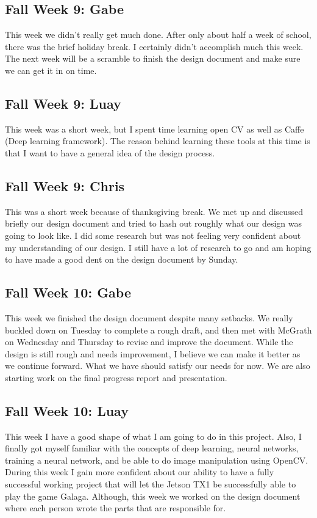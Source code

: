 \documentclass[onecolumn, draftclsnofoot,10pt, compsoc]{IEEEtran}
\begin{document}
\subsection{Fall Week 9: Gabe}
This week we didn't really get much done. After only about half a week of school, there was the brief holiday break. I certainly didn't accomplish much this week. The next week will be a scramble to finish the design document and make sure we can get it in on time.
\subsection{Fall Week 9: Luay}
This week was a short week, but I spent time learning open CV as well as Caffe (Deep learning framework). The reason behind learning these tools at this time is that I want to have a general idea of the design process.
\subsection{Fall Week 9: Chris}
This was a short week because of thanksgiving break. We met up and discussed briefly our design document and tried to hash out roughly what our design was going to look like. I did some research but was not feeling very confident about my understanding of our design. I still have a lot of research to go and am hoping to have made a good dent on the design document by Sunday.
\subsection{Fall Week 10: Gabe}
This week we finished the design document despite many setbacks. We really buckled down on Tuesday to complete a rough draft, and then met with McGrath on Wednesday and Thursday to revise and improve the document. While the design is still rough and needs improvement, I believe we can make it better as we continue forward. What we have should satisfy our needs for now. We are also starting work on the final progress report and presentation.
\subsection{Fall Week 10: Luay}
This week I have a good shape of what I am going to do in this project. Also, I finally got myself familiar with the concepts of deep learning, neural networks, training a neural network, and be able to do image manipulation using OpenCV. During this week I gain more confident about our ability to have a fully successful working project that will let the Jetson TX1 be successfully able to play the game Galaga. Although, this week we worked on the design document where each person wrote the parts that are responsible for.
\end{document}
